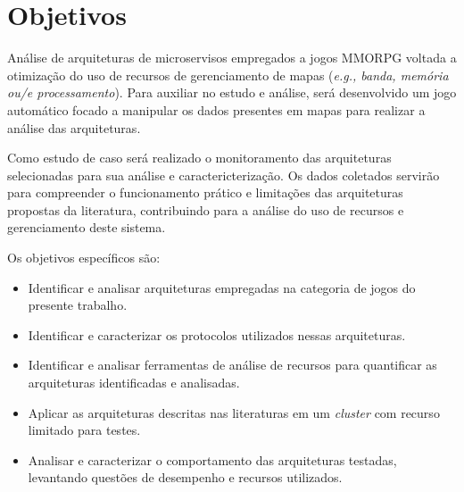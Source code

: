 \section{Objetivos}
\label{obj}

Análise de arquiteturas de microservisos empregados a jogos MMORPG voltada a otimização do uso de recursos de gerenciamento de mapas (\textit{e.g., banda, memória ou/e processamento}). Para auxiliar no estudo e análise, será desenvolvido um jogo automático focado a manipular os dados presentes em  mapas para realizar a análise das arquiteturas.

Como estudo de caso será realizado o monitoramento das arquiteturas selecionadas para sua análise e caractericterização. Os dados coletados servirão para compreender o funcionamento prático e limitações das arquiteturas propostas da literatura, contribuindo para a análise do uso de recursos e gerenciamento deste sistema.

Os objetivos específicos são:
\begin{itemize}
    \item Identificar e analisar arquiteturas empregadas na categoria de jogos do presente trabalho.
    \item Identificar e caracterizar os protocolos utilizados nessas arquiteturas.
    \item Identificar e analisar ferramentas de análise de recursos para quantificar as arquiteturas identificadas e analisadas.
    \item Aplicar as arquiteturas descritas nas literaturas em um \textit{cluster} com recurso limitado para testes.
    \item Analisar e caracterizar o comportamento das arquiteturas testadas, levantando questões de desempenho e recursos utilizados.
\end{itemize}
